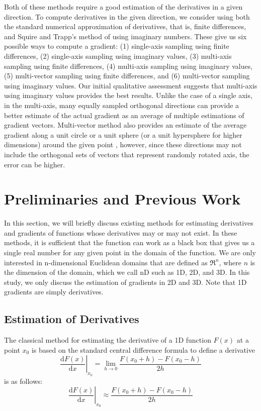 \documentclass{article}
\begin{document}
Both of these methods require a good estimation of the derivatives in a given direction. To compute derivatives in the given direction, we consider using both the standard numerical approximation of derivatives, that is, finite differences, and Squire and Trapp's \cite{squire1998} method of using imaginary numbers.  These give us six possible ways to compute a gradient: (1) single-axis sampling using finite differences, (2) single-axis sampling using imaginary values, (3) multi-axis sampling using finite differences, (4) multi-axis sampling using imaginary values, (5) multi-vector sampling using finite differences, and (6) multi-vector sampling using imaginary values. Our initial qualitative assessment suggests that multi-axis using imaginary values provides the best results. Unlike the case of a single axis, in the multi-axis, many equally sampled orthogonal directions can provide a better estimate of the actual gradient as an average of multiple estimations of gradient vectors.  Multi-vector method also provides an estimate of the average gradient along a unit circle or a unit sphere (or a unit hypersphere for higher dimensions) around the given point \cite{hart1989}, however, since these directions may not include the orthogonal sets of vectors that represent randomly rotated axis, the error can be higher. 

\section{Preliminaries and Previous Work}

In this section, we will briefly discuss existing methods for estimating derivatives and gradients of functions whose derivatives may or may not exist. In these methods, it is sufficient that the function can work as a black box that gives us a single real number for any given point in the domain of the function. We are only interested in n-dimensional Euclidean domains that are defined as $\Re^n$, where $n$ is the dimension of the domain, which we call nD such as 1D, 2D, and 3D. In this study, we only discuss the estimation of gradients in 2D and 3D. Note that 1D gradients are simply derivatives. 

\subsection{Estimation of Derivatives}

The classical method for estimating the derivative of a 1D function $F(x)$ at a point $x_0$ is based on the standard central difference formula to define a derivative
$$\left. \frac{\mathrm{d} F(x)}{\mathrm{d} x} \right|_{x_0} = \lim_{h \rightarrow 0} \frac{F(x_0+h)-F(x_0-h)}{2h}$$
is as follows:
$$\left. \frac{\mathrm{d}F(x)}{\mathrm{d}x} \right|_{x_0} \approx \frac{F(x_0+h)-F(x_0-h)}{2h}$$
\end{document}

